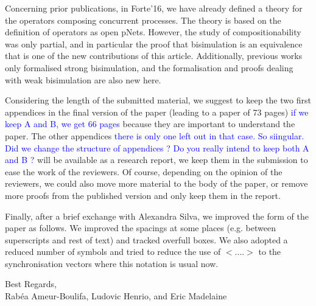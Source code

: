 \documentclass[10pt]{article}
\newcommand{\Eric}[1]{\textcolor{blue}{#1}}
\begin{document}
Concerning prior publications, in Forte'16, we have already defined a theory for the operators composing concurrent processes. The theory is based on the definition of operators as open pNets. However, the study of compositionability was only partial, and in particular the proof that bisimulation is an equivalence that is one of the new contributions of this article. Additionally, previous works only formalised strong bisimulation, and the formalisation and proofs dealing with weak bisimulation are also new here.




\smallskip

Considering the length of the submitted material,
 we   suggest to
keep the two first appendices in the final version of the paper (leading to a
paper of 73 pages) \Eric{if we keep A and B, we get 66 pages} because they are important to understand the paper.
The other appendices \Eric{there is only one left out in that case. So siingular. Did we change the structure of appendices ? Do you really intend to keep both A and B ?} will be available as a research report, we keep
them in the submission to ease the work of the reviewers. 
Of course, depending on the opinion of the reviewers, we could also move more material to  the body of the paper, or remove more proofs from the published version and only keep them in the report.


\smallskip

Finally, after a brief exchange with Alexandra Silva, we improved the form of the paper as follows. We improved the spacings at some places (e.g. between superscripts and rest of text) and tracked overfull boxes. We also adopted a reduced number of symbols and tried to reduce the use of $<....>$ to the synchronisation vectors where this notation is usual now.

\begin{flushright}
  Best Regards,\\
  Rab\'ea Ameur-Boulifa, Ludovic Henrio, and Eric Madelaine
\end{flushright}
\end{document}
